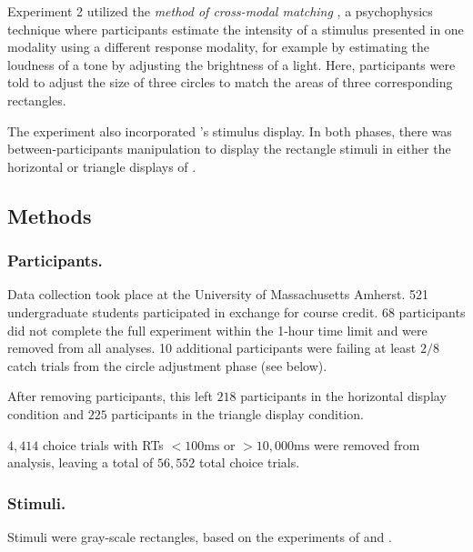 Experiment 2 utilized the \textit{method of cross-modal matching} \parencite{stevensCrossmodalityMatchingBrightness1965}, a psychophysics technique where participants estimate the intensity of a stimulus presented in one modality using a different response modality, for example by estimating the loudness of a tone by adjusting the brightness of a light. Here, participants were told to adjust the size of three circles to match the areas of three corresponding rectangles. 

The experiment also incorporated \textcite{spektorWhenGoodLooks2018b}'s stimulus display. In both phases, there was between-participants manipulation to display the rectangle stimuli in either the horizontal or triangle displays of \textcite{spektorWhenGoodLooks2018b}.

\subsection{Methods}
\subsubsection{Participants.}
Data collection took place at the University of Massachusetts Amherst. 521 undergraduate students participated in exchange for course credit. 68 participants did not complete the full experiment within the 1-hour time limit and were removed from all analyses. 10 additional participants were failing at least $2/8$ catch trials from the circle adjustment phase (see below). 

After removing participants, this left $218$ participants in the horizontal display condition and $225$ participants in the triangle display condition. 

$4,414$ choice trials with RTs $<100\text{ms}$ or $>10,000\text{ms}$ were removed from analysis, leaving a total of $56,552$ total choice trials.

\subsubsection{Stimuli.}
Stimuli were gray-scale rectangles, based on the experiments of \textcite{spektorWhenGoodLooks2018b} and \textcite{trueblood2013not}. 

